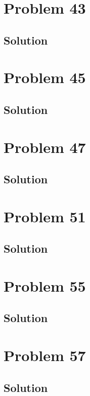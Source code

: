 \documentclass[12pt]{article}
\begin{document}
    \section{Problem 43}

        \subsection{Solution}

    \pagebreak
    \section{Problem 45}

        \subsection{Solution}

    \pagebreak
    \section{Problem 47}

        \subsection{Solution}

    \pagebreak
    \section{Problem 51}

        \subsection{Solution}

    \pagebreak
    \section{Problem 55}

        \subsection{Solution}

    \pagebreak
    \section{Problem 57}

        \subsection{Solution}
\end{document}
